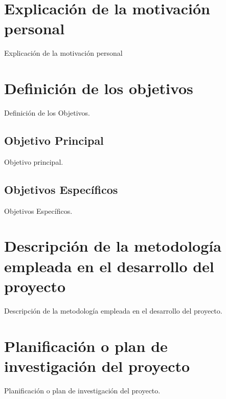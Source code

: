 \section{Explicación de la motivación personal}

Explicación de la motivación personal

\section{Definición de los objetivos}

Definición de los Objetivos.

\subsection{Objetivo Principal}

Objetivo principal.


\subsection{Objetivos Específicos}

Objetivos Específicos.

\section{Descripción de la metodología empleada en el desarrollo del proyecto}

Descripción de la metodología empleada en el desarrollo del proyecto.

\section{Planificación o plan de investigación del proyecto}

Planificación o plan de investigación del proyecto.


